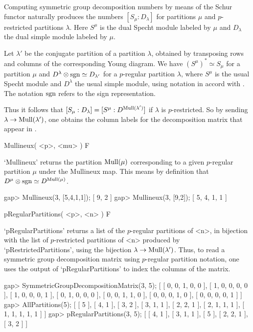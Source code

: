 
Computing symmetric group decomposition numbers by means of the Schur
functor naturally produces the numbers $[S_\mu: D_\lambda]$ for
partitions $\mu$ and $p$-restricted partitions $\lambda$. Here $S^\mu$
is the dual Specht module labeled by $\mu$ and $D_\lambda$ the dual
simple module labeled by $\mu$. 

Let $\lambda'$ be the conjugate partition of a partition $\lambda$,
obtained by transposing rows and columns of the corresponding Young
diagram. We have $(S^{\mu})^\ast \simeq S_\mu$ for a partition $\mu$
and $D^\lambda \otimes {\rm sgn} \simeq D_{\lambda'}$ for a
$p$-regular partition $\lambda$, where $S^\mu$ is the usual Specht
module and $D^\lambda$ the usual simple module, using notation in
accord with \cite{James}. The notation ${\rm sgn}$ refers to the sign
representation.

Thus it follows that $[S_\mu: D_\lambda] = [S^\mu: D^{{\rm
    Mull}(\lambda')}]$ if $\lambda$ is $p$-restricted. So by sending
$\lambda \to {\rm Mull}(\lambda')$, one obtains the column labels for
the decomposition matrix that appear in \cite{James}.

\>Mullineux( <p>, <mu> ) F

`Mullineux' returns the partition ${\rm Mull}(\mu)$ corresponding to a
given $p$-regular partition $\mu$ under the Mullineux map. This means
by definition that $D^\mu \otimes {\rm sgn} \simeq D^{{\rm
    Mull}(\mu)}$.

\beginexample
gap> Mullineux(3, [5,4,1,1]);
[ 9, 2 ]
gap> Mullineux(3, [9,2]);    
[ 5, 4, 1, 1 ]
\endexample

\>pRegularPartitions( <p>, <n> ) F

`pRegularPartitions' returns a list of the $p$-regular partitions of
<n>, in bijection with the list of $p$-restricted partitions of <n>
produced by `pRestrictedPartitions', using the bijection $\lambda \to
{\rm Mull}(\lambda')$. Thus, to read a symmetric group decomposition
matrix using $p$-regular partition notation, one uses the output of
`pRegularPartitions' to index the columns of the matrix.

\beginexample
gap> SymmetricGroupDecompositionMatrix(3, 5);
[ [ 0, 0, 1, 0, 0 ], [ 1, 0, 0, 0, 0 ], [ 1, 0, 0, 0, 1 ], [ 0, 1, 0, 0, 0 ], 
  [ 0, 0, 1, 1, 0 ], [ 0, 0, 0, 1, 0 ], [ 0, 0, 0, 0, 1 ] ]
gap> AllPartitions(5);                       
[ [ 5 ], [ 4, 1 ], [ 3, 2 ], [ 3, 1, 1 ], [ 2, 2, 1 ], [ 2, 1, 1, 1 ], 
  [ 1, 1, 1, 1, 1 ] ]
gap> pRegularPartitions(3, 5);
[ [ 4, 1 ], [ 3, 1, 1 ], [ 5 ], [ 2, 2, 1 ], [ 3, 2 ] ]
\endexample

